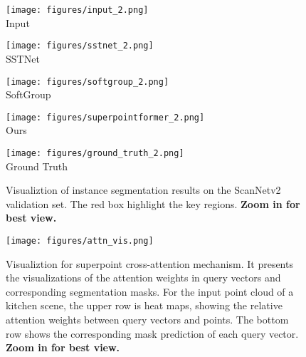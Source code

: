 \documentclass[letterpaper]{article} \usepackage{aaai23}  \usepackage{times}  \usepackage{helvet}  \usepackage{courier}  \usepackage[hyphens]{url}  \usepackage{graphicx} \urlstyle{rm} \def\UrlFont{\rm}  \usepackage{natbib}  \usepackage{caption} \frenchspacing  \setlength{\pdfpagewidth}{8.5in}  \setlength{\pdfpageheight}{11in}  \usepackage{algorithm}
\begin{document}
\begin{figure*}[t]
    \centering
    \begin{minipage}[htbp]{0.19\textwidth}
    \centering
    \texttt{[image: figures/input\_2.png]}\\
    Input
    \end{minipage}\begin{minipage}[htbp]{0.19\textwidth}
    \centering
    \texttt{[image: figures/sstnet\_2.png]}\\
    SSTNet
    \end{minipage}\begin{minipage}[htbp]{0.19\textwidth}
    \centering
    \texttt{[image: figures/softgroup\_2.png]}\\
    SoftGroup
    \end{minipage}\centering
    \begin{minipage}[htbp]{0.19\textwidth}
    \centering
    \texttt{[image: figures/superpointformer\_2.png]}\\
    Ours
    \end{minipage}\begin{minipage}[htbp]{0.19\textwidth}
    \centering
    \texttt{[image: figures/ground\_truth\_2.png]}\\
    Ground Truth
    \end{minipage}\caption{Visualiztion of instance segmentation results on the ScanNetv2 validation set. The red box highlight the key regions. \textbf{Zoom in for best view.}}
    \label{fig:vis}
\end{figure*}

\begin{figure*}[t]
    \centering
    \texttt{[image: figures/attn\_vis.png]}
    \caption{Visualiztion for superpoint cross-attention mechanism. It presents the visualizations of the attention weights in query vectors and corresponding segmentation masks. For the input point cloud of a kitchen scene, the upper row is heat maps, showing the relative attention weights between query vectors and points. The bottom row shows the corresponding mask prediction of each query vector. \textbf{Zoom in for best view.}}
    \label{fig:attn_vis}
\end{figure*}
\end{document}
